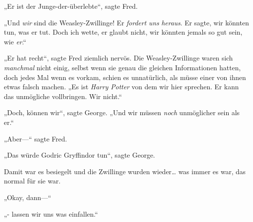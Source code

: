 „Er ist der Junge-der-überlebte“, sagte Fred.

„Und \emph{wir} sind die Weasley-Zwillinge! Er \emph{fordert uns} \emph{heraus}. Er sagte, wir könnten tun, was er tut. Doch ich wette, er glaubt nicht, wir könnten jemals so gut sein, wie \emph{er}.“

„Er hat recht“, sagte Fred ziemlich nervös. Die Weasley-Zwillinge waren sich \emph{manchmal} nicht einig, selbst wenn sie genau die gleichen Informationen hatten, doch jedes Mal wenn es vorkam, schien es unnatürlich, als müsse einer von ihnen etwas falsch machen. „Es ist \emph{Harry Potter} von dem wir hier sprechen. Er kann das unmögliche vollbringen. Wir nicht.“

„Doch, können wir“, sagte George. „Und wir müssen \emph{noch} unmöglicher sein als er.“

„Aber—“ sagte Fred.

„Das würde Godric Gryffindor tun“, sagte George.

Damit war es besiegelt und die Zwillinge wurden wieder… was immer es war, das normal für sie war.

„Okay, dann—“

„- lassen wir uns was einfallen.“

